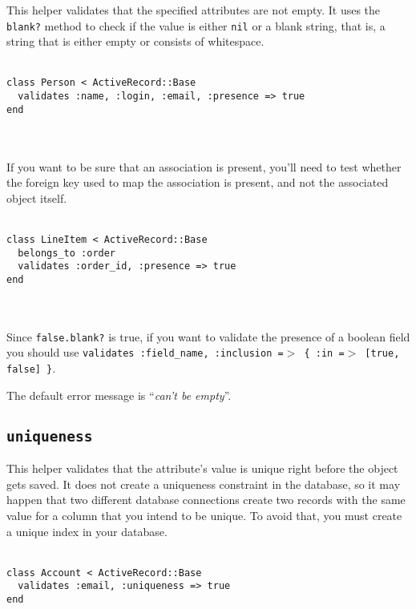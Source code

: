 \documentclass[10pt]{book}
\begin{document}
This helper validates that the specified attributes are not empty. It uses the \texttt{blank?} method to check if the value is either \texttt{nil} or a blank string, that is, a string that is either empty or consists of whitespace.
\\ \\
\begin{minipage}{\textwidth}{\scriptsize
\begin{verbatim}
class Person < ActiveRecord::Base
  validates :name, :login, :email, :presence => true
end
\end{verbatim}}
\end{minipage}
\\ \\

If you want to be sure that an association is present, you’ll need to  test whether the foreign key used to map the association is present,  and not the associated object itself.
\\ \\
\begin{minipage}{\textwidth}{\scriptsize
\begin{verbatim}
class LineItem < ActiveRecord::Base
  belongs_to :order
  validates :order_id, :presence => true
end
\end{verbatim}}
\end{minipage}
\\ \\

Since \texttt{false.blank?} is true, if you want to validate the presence of a boolean field you should use \texttt{validates :field\_name, :inclusion =$>$ \{ :in =$>$ [true, false] \}}.

The default error message is “\emph{can’t be empty}”.

\subsection{ \texttt{uniqueness}}

This helper validates that the attribute’s value is unique right  before the object gets saved. It does not create a uniqueness constraint  in the database, so it may happen that two different database  connections create two records with the same value for a column that you  intend to be unique. To avoid that, you must create a unique index in  your database.
\\ \\
\begin{minipage}{\textwidth}{\scriptsize
\begin{verbatim}
class Account < ActiveRecord::Base
  validates :email, :uniqueness => true
end
\end{verbatim}}
\end{minipage}
\\ \\
\end{document}
